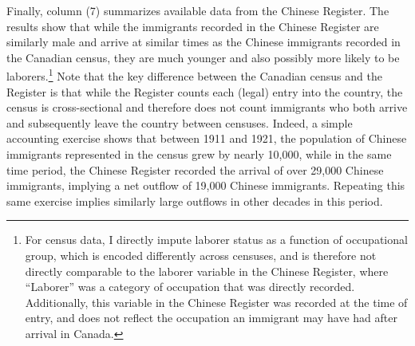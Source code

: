 Finally, column (7) summarizes available data from the Chinese Register. The results show that while the immigrants recorded in the Chinese Register are similarly male and arrive at similar times as the Chinese immigrants recorded in the Canadian census, they are much younger and also possibly more likely to be laborers.\footnote{For census data, I directly impute laborer status as a function of occupational group, which is encoded differently across censuses, and is therefore not directly comparable to the laborer variable in the Chinese Register, where ``Laborer'' was a category of occupation that was directly recorded. Additionally, this variable in the Chinese Register was recorded at the time of entry, and does not reflect the occupation an immigrant may have had after arrival in Canada.}
Note that the key difference between the Canadian census and the Register is that while the Register counts each (legal) entry into the country, the census is cross-sectional and therefore does not count immigrants who both arrive and subsequently leave the country between censuses. Indeed, a simple accounting exercise shows that between 1911 and 1921, the population of Chinese immigrants represented in the census grew by nearly 10,000, while in the same time period, the Chinese Register recorded the arrival of over 29,000 Chinese immigrants, implying a net outflow of 19,000 Chinese immigrants. Repeating this same exercise implies similarly large outflows in other decades in this period. 
